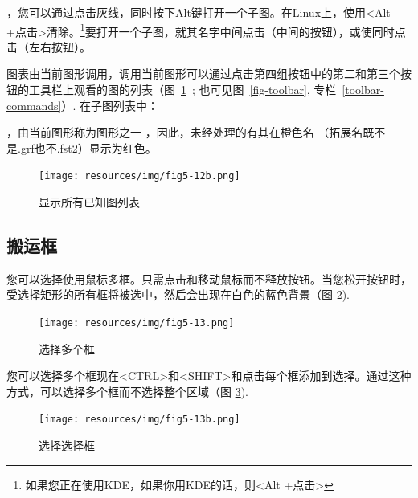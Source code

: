 \bigskip
{}，您可以通过点击灰线，同时按下Alt键打开一个子图。在Linux上，使用<Alt +点击>清除。\footnote {如果您正在使用KDE，如果你用KDE的话，则<Alt +点击>}要打开一个子图，就其名字中间点击（中间的按钮），或使同时点击（左右按钮）。

\bigskip
\noindent 图表由当前图形调用，调用当前图形可以通过点击第四组按钮中的第二和第三个按钮的工具栏上观看的图的列表（图~\ref{list-called-graphs}~; 也可见图~\ref{fig-toolbar}, 专栏~\ref{toolbar-commands}）.
在子图列表中：
\begin{itemize}
，由当前图形称为图形之一
，因此，未经处理的有其在橙色名
（拓展名既不是.grf也不.fst2）显示为红色。
\end{itemize}

\begin{figure}[!h]
\begin{center}
\texttt{[image: resources/img/fig5-12b.png]}
\caption{显示所有已知图列表\label{list-called-graphs}}
\end{center}
\end{figure}



\subsection{搬运框}

您可以选择使用鼠标多框。只需点击和移动鼠标而不释放按钮。当您松开按钮时，受选择矩形的所有框将被选中，然后会出现在白色的蓝色背景（图 \ref{multi-selection}).

\begin{figure}[!ht]
\begin{center}
\texttt{[image: resources/img/fig5-13.png]}
\caption{选择多个框\label{multi-selection}}
\end{center}
\end{figure}

\bigskip
\noindent 您可以选择多个框现在<CTRL>和<SHIFT>和点击每个框添加到选择。通过这种方式，可以选择多个框而不选择整个区域（图 \ref{multi-selection2}).

\begin{figure}[!ht]
\begin{center}
\texttt{[image: resources/img/fig5-13b.png]}
\caption{选择选择框\label{multi-selection2}}
\end{center}
\end{figure}

